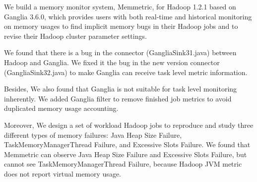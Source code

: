 We build a memory monitor system, Memmetric, for Hadoop 1.2.1 based on Ganglia 3.6.0, which provides users with both real-time and historical monitoring on memory usages to find implicit memory bugs in their Hadoop jobs and to revise their Hadoop cluster parameter settings. 

We found that there is a bug in the connector (GangliaSink31.java) between Hadoop and Ganglia. We fixed it the bug in the new version connector (GangliaSink32.java) to make Ganglia can receive task level metric information.

Besides, We also found that Ganglia is not suitable for task level monitoring inherently. We added Ganglia filter to remove finished job metrics to avoid duplicated memory usage accounting.

Moreover, We design a set of workload Hadoop jobs to reproduce and study three different types of memory failures: Java Heap Size Failure, TaskMemoryManagerThread Failure, and Excessive Slots Failure. We found that Memmetric can observe Java Heap Size Failure and Excessive Slots Failure, but cannot see TaskMemoryManagerThread Failure, because Hadoop JVM metric does not report virtual memory usage.
